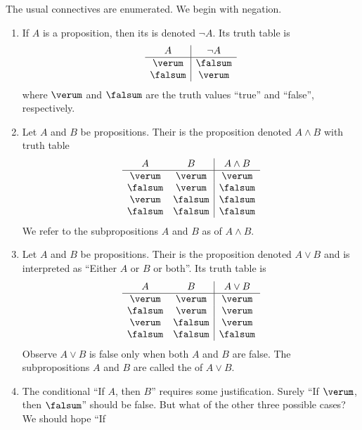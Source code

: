 
\begin{node}[Semantics]\label{prop-000K}%
\begin{node}[Connectives]\label{prop-0001}%
  The usual connectives are enumerated. We begin with negation.
\begin{enumerate}
\item If $A$ is
a proposition, then its  is denoted $\neg A$. Its truth table is
\[\begin{array}{c|c}
A & \neg A\\ \hline
\verum & \falsum\\
\falsum & \verum\\
\end{array}\]
where $\verum$ and $\falsum$ are the truth values ``true'' and
``false'', respectively.
\item Let $A$ and $B$ be propositions. Their  is the
  proposition denoted $A\land B$ with truth table
\[\begin{array}{cc|c}
A & B & A\land B\\\hline
\verum  & \verum  & \verum\\
\falsum & \verum  & \falsum\\
\verum  & \falsum & \falsum\\
\falsum & \falsum & \falsum\\
\end{array}\]
We refer to the subpropositions $A$ and $B$ as  of
$A\land B$.
\item Let $A$ and $B$ be propositions. Their  is the
  proposition denoted $A\lor B$ and is interpreted as ``Either $A$ or
  $B$ or both''. Its truth table is
\[\begin{array}{cc|c}
A & B & A\lor B\\\hline
\verum  & \verum  & \verum\\
\falsum & \verum  & \verum\\
\verum  & \falsum & \verum\\
\falsum & \falsum & \falsum\\
\end{array}\]
Observe $A\lor B$ is false only when both $A$ and $B$ are false.
The subpropositions $A$ and $B$ are called the  of
$A\lor B$.
\item The conditional ``If $A$, then $B$'' requires some
  justification. Surely ``If $\verum$, then $\falsum$'' should be
  false. But what of the other three possible cases? We should hope ``If

\end{enumerate}
\end{node}
\end{node}
